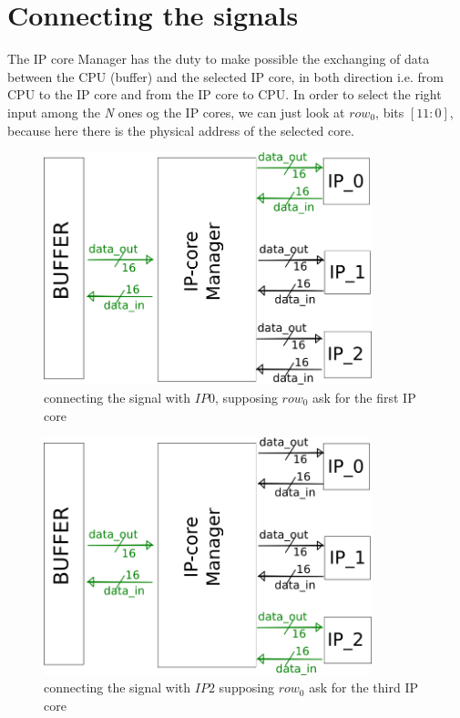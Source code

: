 \section{Connecting the signals}
The IP core Manager has the duty to make possible the exchanging of data between the CPU (buffer) and the selected IP core, in both direction i.e. from CPU to the IP core and from the IP core to CPU.
In order to select the right input among the \textit{N} ones og the IP cores, we can just look at $ row_0 $, bits $ [11:0] $, because here there is the physical address of the selected core.
\bigskip

\begin{figure}[h!]
	\centering	
	\includegraphics[width=0.85\textwidth]{imm/ip_func/x_switch22.png}  
	\caption{connecting the signal with $ IP0 $, supposing $ row_0 $ ask for the first IP core} 
	\label{fig:x_switch1}
\end{figure}
\bigskip

\begin{figure}[h!]
	\centering	
	\includegraphics[width=0.85\textwidth]{imm/ip_func/x_switch33.png}  
	\caption{connecting the signal with $ IP2 $ supposing $ row_0 $ ask for the third IP core} 
	\label{fig:x_switch2}
\end{figure}


